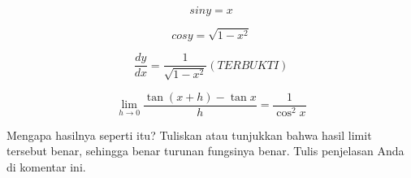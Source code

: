 \documentclass{article}
\begin{document}
\begin{eulernotebook}
\begin{eulercomment}
\begin{eulercomment}
\begin{eulercomment}
\end{eulercomment}
\begin{eulerformula}
\[
siny=x
\]
\end{eulerformula}
\begin{eulercomment}
\end{eulercomment}
\begin{eulerformula}
\[
cosy=\sqrt{1-x^2}
\]
\end{eulerformula}
\begin{eulercomment}
\end{eulercomment}
\begin{eulerformula}
\[
\frac{dy}{dx} = \frac {1}{\sqrt{1-x^2}}  (TERBUKTI)
\]
\end{eulerformula}
\begin{eulercomment}
\end{eulercomment}
\eulersubheading{}
\begin{eulerformula}
\[
\lim_{h\rightarrow 0}{\frac{\tan \left(x+h\right)-\tan x}{h}}=  \frac{1}{\cos ^2x}
\]
\end{eulerformula}
\begin{eulercomment}
Mengapa hasilnya seperti itu? Tuliskan atau tunjukkan bahwa hasil
limit tersebut benar, sehingga benar turunan fungsinya benar. Tulis
penjelasan Anda di komentar ini.


\end{eulercomment}
\end{eulercomment}
\end{eulercomment}
\end{eulernotebook}
\end{document}
